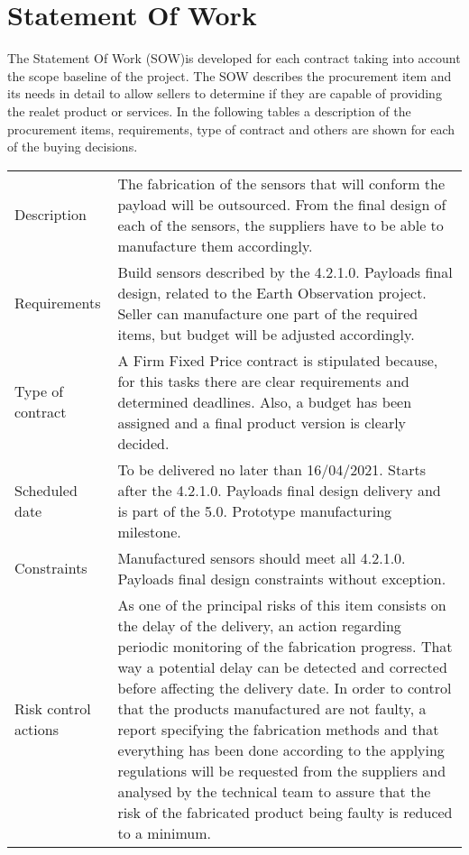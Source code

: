 \section{Statement Of Work}
The Statement Of Work (SOW)is developed for each contract taking into account the scope baseline of the project. The SOW describes the procurement item and its needs in detail to allow sellers to determine if they are capable of providing the realet product or services.
In the following tables a description of the procurement items, requirements, type of contract and others are shown for each of the buying decisions.
\begin{table}[H]
	\centering
	\begin{tabular}
		{>{\raggedright\arraybackslash}p{3cm} >{\arraybackslash}p{11cm}}
		
		\toprule[2pt]
		
		\multicolumn{2}{c}{\textbf{SOW - 5.1.1. Manufacturing of payload sensors}}\\
		
		\midrule[1.5pt]
		
		Description & The fabrication of the sensors that will conform the payload will be outsourced. From the final design of each of the sensors, the suppliers have to be able to manufacture them accordingly. \\
		\hline
		
		Requirements & Build sensors described by the 4.2.1.0. Payloads final design, related to the Earth Observation project. Seller can manufacture one part of the required items, but budget will be adjusted accordingly.\\
		\hline
		
		Type of contract & A Firm Fixed Price contract is stipulated because, for this tasks there are clear requirements and determined deadlines. Also, a budget has been assigned and a final product version is clearly decided.\\
		\hline
		
		Scheduled date & To be delivered no later than 16/04/2021. Starts after the 4.2.1.0. Payloads final design delivery and is part of the 5.0. Prototype manufacturing milestone.\\
		\hline
		
		Constraints & Manufactured sensors should meet all 4.2.1.0. Payloads final design constraints without exception.\\
		\hline
		
		Risk control actions & As one of the principal risks of this item consists on the delay of the delivery, an action regarding periodic monitoring of the fabrication progress. That way a potential delay can be detected and corrected before affecting the delivery date.
		In order to control that the products manufactured are not faulty, a report specifying the fabrication methods and that everything has been done according to the applying regulations will be requested from the suppliers and analysed by the technical team to assure that the risk of the fabricated product being faulty is reduced to a minimum.\\
		\hline
		

\end{tabular}
\end{table}
